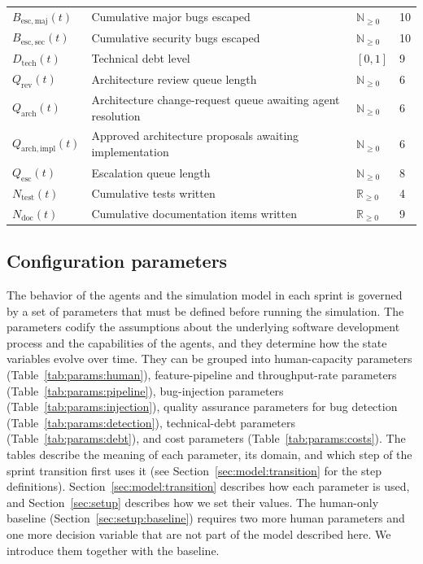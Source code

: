 \documentclass[smallextended]{svjour3}       %
\begin{document}
\begin{table}[t]
\begin{tabularx}{\linewidth}{p{2.3cm}Xp{1.5cm}p{1.4cm}}
$B_\mathrm{esc,maj}(t)$     & Cumulative major bugs escaped               & $\mathbb{N}_{\geq 0}$  & 10 \\[2pt]
$B_\mathrm{esc,sec}(t)$     & Cumulative security bugs escaped            & $\mathbb{N}_{\geq 0}$  & 10 \\[2pt]
\midrule
$D_\mathrm{tech}(t)$                      & Technical debt level                                   & $[0, 1]$               & 9 \\[2pt]
$Q_\mathrm{rev}(t)$         & Architecture review queue length                                                              & $\mathbb{N}_{\geq 0}$  & 6 \\[2pt]
$Q_\mathrm{arch}(t)$        & Architecture change-request queue awaiting agent resolution  & $\mathbb{N}_{\geq 0}$  & 6 \\[2pt]
$Q_\mathrm{arch,impl}(t)$   & Approved architecture proposals awaiting implementation    & $\mathbb{N}_{\geq 0}$  & 6 \\[2pt]
$Q_\mathrm{esc}(t)$         & Escalation queue length                     & $\mathbb{N}_{\geq 0}$  & 8 \\[2pt]
\midrule
$N_\mathrm{test}(t)$        & Cumulative tests written     & $\mathbb{R}_{\geq 0}$  & 4 \\[2pt]
$N_\mathrm{doc}(t)$         & Cumulative documentation items written & $\mathbb{R}_{\geq 0}$  & 9 \\
\bottomrule
\end{tabularx}
\end{table}


\subsection{Configuration parameters}
\label{sec:model:parameters}

The behavior of the agents and the simulation model in each sprint
is governed by a set of parameters that must be defined before running the simulation. 
The parameters codify the assumptions about the underlying software development process and the capabilities of the agents, and they determine how the state variables evolve over time. They can be grouped into human-capacity parameters (Table~\ref{tab:params:human}), feature-pipeline and throughput-rate parameters (Table~\ref{tab:params:pipeline}), bug-injection parameters (Table~\ref{tab:params:injection}), quality assurance parameters for bug detection (Table~\ref{tab:params:detection}), technical-debt parameters (Table~\ref{tab:params:debt}), and cost parameters (Table~\ref{tab:params:costs}). The tables describe the meaning of each parameter, its domain, and which step of the sprint transition first uses it (see Section~\ref{sec:model:transition} for the step definitions). Section~\ref{sec:model:transition} describes how each parameter is used, and Section~\ref{sec:setup} describes how we set their values. The human-only baseline (Section~\ref{sec:setup:baseline}) requires two more human parameters and one more decision variable that are not part of the model described here. We introduce them together with the baseline.
\end{document}

